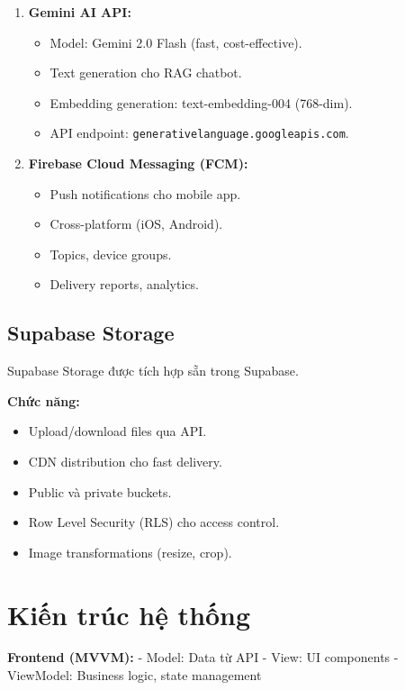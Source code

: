 \begin{enumerate}
    \item \textbf{Gemini AI API:}
    \begin{itemize}
        \item Model: Gemini 2.0 Flash (fast, cost-effective).
        \item Text generation cho RAG chatbot.
        \item Embedding generation: text-embedding-004 (768-dim).
        \item API endpoint: \texttt{generativelanguage.googleapis.com}.
    \end{itemize}

    \item \textbf{Firebase Cloud Messaging (FCM):}
    \begin{itemize}
        \item Push notifications cho mobile app.
        \item Cross-platform (iOS, Android).
        \item Topics, device groups.
        \item Delivery reports, analytics.
    \end{itemize}
\end{enumerate}

\subsection{Supabase Storage}

Supabase Storage được tích hợp sẵn trong Supabase.

\textbf{Chức năng:}
\begin{itemize}
    \item Upload/download files qua API.
    \item CDN distribution cho fast delivery.
    \item Public và private buckets.
    \item Row Level Security (RLS) cho access control.
    \item Image transformations (resize, crop).
\end{itemize}

\section{Kiến trúc hệ thống}

\textbf{Frontend (MVVM):} 
- Model: Data từ API
- View: UI components
- ViewModel: Business logic, state management

